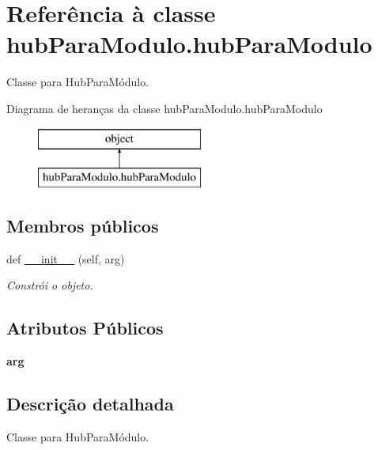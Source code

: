 \hypertarget{classhub_para_modulo_1_1hub_para_modulo}{}\section{Referência à classe hub\+Para\+Modulo.\+hub\+Para\+Modulo}
\label{classhub_para_modulo_1_1hub_para_modulo}


Classe para Hub\+Para\+Módulo.  


Diagrama de heranças da classe hub\+Para\+Modulo.\+hub\+Para\+Modulo\begin{figure}[H]
\begin{center}
\leavevmode
\includegraphics[height=2.000000cm]{classhub_para_modulo_1_1hub_para_modulo}
\end{center}
\end{figure}
\subsection*{Membros públicos}
\begin{DoxyCompactItemize}
\item 
def \hyperlink{classhub_para_modulo_1_1hub_para_modulo_ade87566b026b9f9527db05e4b97a29e7}{\+\_\+\+\_\+init\+\_\+\+\_\+} (self, arg)
\begin{DoxyCompactList}\small\item\em Constrói o objeto. \end{DoxyCompactList}\end{DoxyCompactItemize}
\subsection*{Atributos Públicos}
\begin{DoxyCompactItemize}
\item 
{\bfseries arg}\hypertarget{classhub_para_modulo_1_1hub_para_modulo_a37c7d5bf50dc398e9a15f003da4e29bb}{}\label{classhub_para_modulo_1_1hub_para_modulo_a37c7d5bf50dc398e9a15f003da4e29bb}

\end{DoxyCompactItemize}


\subsection{Descrição detalhada}
Classe para Hub\+Para\+Módulo. 

